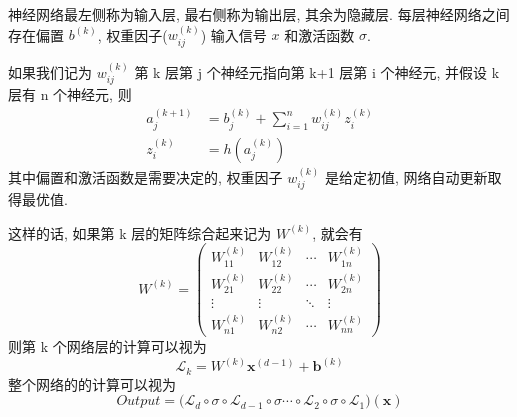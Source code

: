 \begin{definition}
    神经网络最左侧称为输入层, 最右侧称为输出层, 其余为隐藏层. 每层神经网络之间存在偏置 $ b^{(k)} $, 权重因子($w_{ij}^{(k)}$) 输入信号 $ x $ 和激活函数 $ \sigma $.
    
    如果我们记为 $w_{ij}^{(k)}$ 第 k 层第 j 个神经元指向第 k+1 层第 i 个神经元, 并假设 k 层有 n 个神经元, 则 
    \begin{equation}
        \begin{aligned}
         a_{j}^{(k+1)} &= b_{j}^{(k)} + \sum_{i=1}^{n}w_{ij}^{(k)}z_{i}^{(k)} \\
         z_{i}^{(k)} &= h(a_{j}^{(k)})           
        \end{aligned}
    \end{equation}
    其中偏置和激活函数是需要决定的, 权重因子 $ w_{ij}^{(k)} $ 是给定初值, 网络自动更新取得最优值. 

    这样的话, 如果第 k 层的矩阵综合起来记为 $ W^{(k)} $, 就会有
    \begin{equation} W^{(k)} = 
        \begin{pmatrix}
            W_{11}^{(k)} &  W_{12}^{(k)} & \cdots & W_{1n}^{(k)} \\
            W_{21}^{(k)} &  W_{22}^{(k)} & \cdots & W_{2n}^{(k)} \\
            \vdots & \vdots & \ddots & \vdots \\
            W_{n1}^{(k)} &  W_{n2}^{(k)} & \cdots & W_{nn}^{(k)}
        \end{pmatrix}
    \end{equation}
    则第 k 个网络层的计算可以视为 
    \begin{equation}
        \mathcal{L}_k = W^{(k)}\textbf{x}^{(d-1)} + \textbf{b}^{(k)}
    \end{equation}
    整个网络的的计算可以视为
    \begin{equation}
             Output = \big( \mathcal{L}_d \circ \sigma \circ \mathcal{L}_{d-1} \circ \sigma \cdots \circ \mathcal{L}_{2} \circ \sigma \circ \mathcal{L}_{1} \big) (\textbf{x})    
    \end{equation}
\end{definition}


